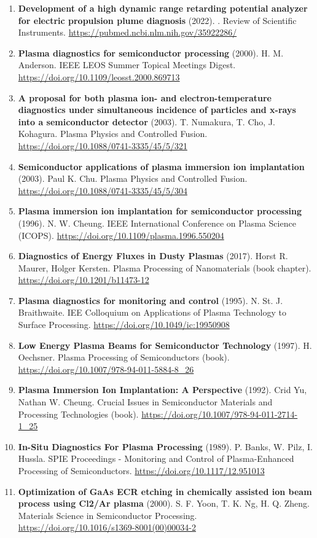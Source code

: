 \documentclass[11pt,a4paper]{article}
\begin{document}
\begin{enumerate}[leftmargin=1.4em]
\item \textbf{Development of a high dynamic range retarding potential analyzer for electric propulsion plume diagnosis} (2022). . Review of Scientific Instruments. \url{https://pubmed.ncbi.nlm.nih.gov/35922286/}
\item \textbf{Plasma diagnostics for semiconductor processing} (2000). H. M. Anderson. IEEE LEOS Summer Topical Meetings Digest. \url{https://doi.org/10.1109/leosst.2000.869713}
\item \textbf{A proposal for both plasma ion- and electron-temperature diagnostics under simultaneous incidence of particles and x-rays into a semiconductor detector} (2003). T. Numakura, T. Cho, J. Kohagura. Plasma Physics and Controlled Fusion. \url{https://doi.org/10.1088/0741-3335/45/5/321}
\item \textbf{Semiconductor applications of plasma immersion ion implantation} (2003). Paul K. Chu. Plasma Physics and Controlled Fusion. \url{https://doi.org/10.1088/0741-3335/45/5/304}
\item \textbf{Plasma immersion ion implantation for semiconductor processing} (1996). N. W. Cheung. IEEE International Conference on Plasma Science (ICOPS). \url{https://doi.org/10.1109/plasma.1996.550204}
\item \textbf{Diagnostics of Energy Fluxes in Dusty Plasmas} (2017). Horst R. Maurer, Holger Kersten. Plasma Processing of Nanomaterials (book chapter). \url{https://doi.org/10.1201/b11473-12}
\item \textbf{Plasma diagnostics for monitoring and control} (1995). N. St. J. Braithwaite. IEE Colloquium on Applications of Plasma Technology to Surface Processing. \url{https://doi.org/10.1049/ic:19950908}
\item \textbf{Low Energy Plasma Beams for Semiconductor Technology} (1997). H. Oechsner. Plasma Processing of Semiconductors (book). \url{https://doi.org/10.1007/978-94-011-5884-8_26}
\item \textbf{Plasma Immersion Ion Implantation: A Perspective} (1992). Crid Yu, Nathan W. Cheung. Crucial Issues in Semiconductor Materials and Processing Technologies (book). \url{https://doi.org/10.1007/978-94-011-2714-1_25}
\item \textbf{In-Situ Diagnostics For Plasma Processing} (1989). P. Banks, W. Pilz, I. Hussla. SPIE Proceedings - Monitoring and Control of Plasma-Enhanced Processing of Semiconductors. \url{https://doi.org/10.1117/12.951013}
\item \textbf{Optimization of GaAs ECR etching in chemically assisted ion beam process using Cl2/Ar plasma} (2000). S. F. Yoon, T. K. Ng, H. Q. Zheng. Materials Science in Semiconductor Processing. \url{https://doi.org/10.1016/s1369-8001(00)00034-2}

\end{enumerate}
\end{document}
